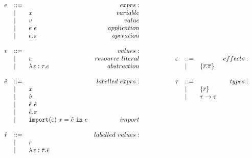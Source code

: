 \begin{figure}[h]
\vspace{-5pt}

\[
\begin{array}{lll}

\begin{array}{lllr}

e & ::= & ~ & exprs: \\
	& | & x & variable \\
	& | & v & value \\
	& | & e ~ e & application \\
	& | & e.\pi & operation \\
	&&\\

v & ::= & ~ & values: \\
	& | & r & resource~literal \\
	& | & \lambda x: \tau.e & abstraction \\
	&&\\
	
\hat e & ::= & ~ & labelled~exprs: \\
	& | & x \\
	& | & \hat v \\
	& | & \hat e ~ \hat e \\
	& | & \hat e.\pi \\
	& | & \mathtt{import}(\varepsilon)~x = \hat e~\mathtt{in}~e & import \\
	&&\\

\hat v & ::= & ~ & labelled~values: \\
	& | & r \\
	& | & \lambda x: \hat \tau.\hat e \\
	&&\\

\end{array}

& ~~~~~~~~&

\begin{array}{lllr}

\varepsilon & ::= & ~ & effects: \\
	& | & \{ \overline{r.\pi} \} \\
	&&\\

\tau & ::= & ~ & types: \\
		& | & \{ \bar r \} \\
		& | & \tau \rightarrow \tau \\ 
		&&\\


\end{array}
\end{array}\]
\end{figure}
